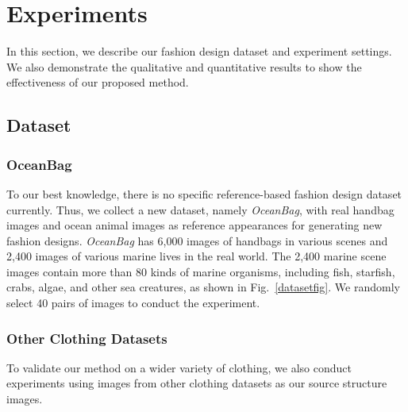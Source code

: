 \section{Experiments}
\label{sec:exp}

In this section, we describe our fashion design dataset and experiment settings. We also demonstrate the qualitative and quantitative results to show the effectiveness of our proposed method.
\subsection{Dataset} 

\subsubsection{OceanBag} 
To our best knowledge, there is no specific reference-based fashion design dataset currently. Thus, we collect a new dataset, namely \textit{OceanBag}, with real handbag images and ocean animal images as reference appearances for generating new fashion designs. 
\textit{OceanBag} has 6,000 images of handbags in various scenes and 2,400 images of various marine lives in the real world. The 2,400 marine scene images contain more than 80 kinds of marine organisms, including fish, starfish, crabs, algae, and other sea creatures, as shown in Fig.~\ref{datasetfig}. We randomly select 40 pairs of images to conduct the experiment.


\subsubsection{Other Clothing Datasets}
To validate our method on a wider variety of clothing, we also conduct experiments using images from other clothing datasets \cite{fashion_dataset,clothing_dataset} as our source structure images. 



